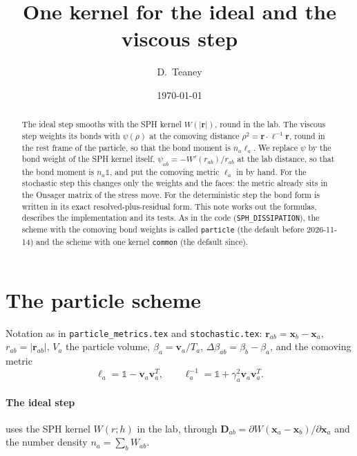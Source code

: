 \documentclass[11pt,aps,preprint,nofootinbib,superscriptaddress,tightenlines]{revtex4-2}
\newcommand{\one}{\mathds{1}}
\def\st{\begin{equation}}
\def\stp{\end{equation}}
\let\oldparagraph\paragraph
\renewcommand{\paragraph}{\par\bigskip\oldparagraph}
\begin{document}
\title{One kernel for the ideal and the viscous step}
\author{D.~Teaney}
\date{\today}

\begin{abstract}
The ideal step smooths with the SPH kernel $W(|\bm r|)$, round in the lab.  The viscous step weights its
bonds with $\psi(\rho)$ at the comoving distance $\rho^2=\bm r\cdot\ell^{-1}\bm r$, round in the rest frame of the
particle, so that the bond moment is $n_a\ell_a$.  We replace $\psi$ by the bond weight of the SPH kernel
itself, $\psi_{ab}=-W'(r_{ab})/r_{ab}$ at the lab distance, so that the bond moment is $n_a\one$, and put the
comoving metric $\ell_a$ in by hand.  For the stochastic step this changes only the weights and the
faces: the metric already sits in the Onsager matrix of the stress move.  For the deterministic step the
bond form is written in its exact resolved-plus-residual form.  This note works out the formulas,
describes the implementation and its tests.  As in the code (\texttt{SPH\_DISSIPATION}), the scheme with the
comoving bond weights is called \texttt{particle} (the default before 2026-11-14) and the scheme with one kernel
\texttt{common} (the default since).
\end{abstract}

\maketitle

\section{The particle scheme}
\label{sec:present}

Notation as in \texttt{particle\_metrics.tex} and \texttt{stochastic.tex}: $\bm r_{ab}=\bm x_b-\bm x_a$, $r_{ab}=|\bm r_{ab}|$,
$V_a$ the particle volume, $\beta_a=\bm v_a/T_a$, $\Delta\beta_{ab}=\beta_b-\beta_a$, and the comoving metric
\st
\ell_a=\one-\bm v_a\bm v_a^T,\qquad \ell_a^{-1}=\one+\gamma_a^2\bm v_a\bm v_a^T .
\stp

\paragraph{The ideal step} uses the SPH kernel $W(r;h)$ in the lab, through $\bm D_{ab}=\partial W(\bm x_a-\bm x_b)/\partial\bm x_a$
and the number density $n_a=\sum_bW_{ab}$.
\end{document}
